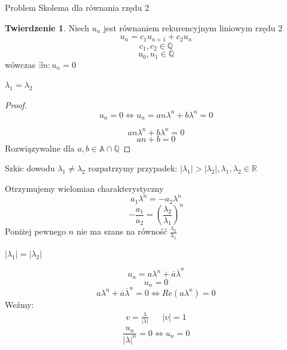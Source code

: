 \documentclass[handout]{beamer}
\def\Q{\mathbb{Q}}
\def\A{\mathbb{A}}
\theoremstyle{definition}
\newtheorem*{twierdzenie}{Twierdzenie}
\theoremstyle{named}
\begin{document}
\begin{frame}{Problem Skolema dla równania rzędu 2}


\begin{twierdzenie}
    Niech $u_n$ jest równaniem rekurencyjnym liniowym rzędu 2
    $$
        u_n = c_1 u_{n+1} + c_2 u_n
    $$
    $$
        c_1, c_2 \in \mathbb{Q}
    $$
    $$
        u_0, u_1 \in \mathbb{Q}
    $$
    wówczas $\exists n : u_n = 0$
\end{twierdzenie}

\end{frame}

\begin{frame}{$\lambda_1= \lambda_2$}

\begin{proof}
    $$u_n = 0 \iff  u_n = a n \lambda^{n} + b \lambda^{n} = 0$$
    
    $$ a n \lambda^{n} + b \lambda^{n} = 0 $$
    $$ a n + b = 0 $$
    Rozwiązywalne dla $a, b \in \A \cap \Q $
\end{proof}

    
\end{frame}

\begin{frame}{Szkic dowodu $\lambda_1 \neq \lambda_2$}
    rozpatrzymy przypadek:
    $|\lambda_1| > |\lambda_2|, \lambda_1, \lambda_2 \in \mathbb{R}$
    
    Otrzymujemy wielomian charakterystyczny 
    $$
       a_1 \lambda^{n} = - a_2 \lambda^{n}
    $$
    $$
        - \frac{a_1}{a_2} = (\frac{\lambda_2}{\lambda_1})^{n}
    $$
    Poniżej pewnego $n$ nie ma szans na równość $\frac{\lambda_2}{\lambda_1}$
\end{frame}

\begin{frame}{$|\lambda_1| = |\lambda_2|$}

\begin{equation*}
    u_n = a \lambda^{n} + \overline{a} \overline{\lambda}^{n} 
\end{equation*}
\pause 
\begin{equation*}
    u_n = 0 
\end{equation*}
\pause 
\begin{equation*}
    a \lambda^{n} + \overline{a} \overline{\lambda}^{n} = 0 \iff Re(a {\lambda^{n}}) = 0 
\end{equation*} 
\pause
Weźmy: 
\begin{align*}
    v = \frac{\lambda}{|\lambda|} && |v| = 1
\end{align*}
$$\frac{u_n}{|\lambda|^{n}} = 0 \iff u_n = 0$$

\end{frame}
    
\end{document}
